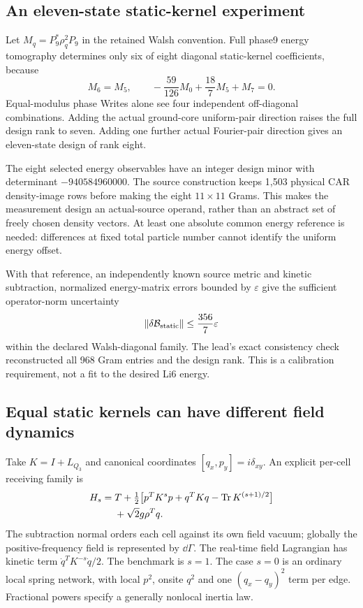 \subsection{An eleven-state static-kernel experiment}
\label{sec:tomography-new}

Let $M_q=P_9^*\rho_q^2P_9$ in the retained Walsh convention. Full phase9
energy tomography determines only six of eight diagonal static-kernel
coefficients, because
\begin{equation}
M_6=M_5,\qquad
-\frac{59}{126}M_0+\frac{18}{7}M_5+M_7=0.
\end{equation}
Equal-modulus phase Writes alone see four independent off-diagonal
combinations. Adding the actual ground-core uniform-pair direction raises
the full design rank to seven. Adding one further actual Fourier-pair
direction gives an eleven-state design of rank eight.

The eight selected energy observables have an integer design minor with
determinant $-940584960000$. The source construction keeps 1,503 physical
CAR density-image rows before making the eight $11\times11$ Grams.
This makes the measurement design an actual-source operand, rather than
an abstract set of freely chosen density vectors. At least one absolute
common energy reference is needed: differences at fixed total particle
number cannot identify the uniform energy offset.

With that reference, an independently known source metric and kinetic
subtraction, normalized energy-matrix errors bounded by $\varepsilon$
give the sufficient operator-norm uncertainty
\begin{equation}
\|\delta\mathcal B_{\rm static}\|\leq\frac{356}{7}\varepsilon
\label{eq:kernel-error-new}
\end{equation}
within the declared Walsh-diagonal family. The lead's exact consistency
check reconstructed all 968 Gram entries and the design rank. This is a
calibration requirement, not a fit to the desired Li6 energy.

\subsection{Equal static kernels can have different field dynamics}
\label{sec:action-family-new}

Take $K=I+L_{Q_3}$ and canonical coordinates $[q_x,p_y]=i\delta_{xy}$.
An explicit per-cell receiving family is
\begin{equation}
\begin{split}
H_s={}&T+\tfrac12\bigl[p^TK^sp+q^TKq
-\operatorname{Tr} K^{(s+1)/2}\bigr]\\
&+\sqrt2g\rho^Tq.
\end{split}
\label{eq:action-family-new}
\end{equation}
The subtraction normal orders each cell against its own field vacuum;
globally the positive-frequency field is represented by $\dd\Gamma$.
The real-time field Lagrangian has kinetic term
$\dot q^TK^{-s}\dot q/2$. The benchmark is $s=1$. The case $s=0$ is an
ordinary local spring network, with local $p^2$, onsite $q^2$ and one
$(q_x-q_y)^2$ term per edge. Fractional powers specify a generally nonlocal
inertia law.

